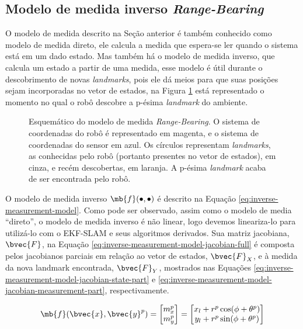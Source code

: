 \subsection{Modelo de medida inverso \textit{Range-Bearing}}
\label{sec:inverse-measurement-model}
O modelo de medida descrito na Seção anterior é também conhecido como modelo de medida direto, ele calcula a medida que espera-se ler quando o sistema está em um dado estado. Mas também há o modelo de medida inverso, que calcula um estado a partir de uma medida, esse modelo é útil durante o descobrimento de novas \textit{landmarks}, pois ele dá meios para que suas posições sejam  incorporadas no vetor de estados, na Figura \ref{fig:range-bearing-inverse-model-schematic} está representado o momento no qual o robô descobre a p-ésima \textit{landmark} do ambiente.
\begin{figure}[h]
  
  \caption{Esquemático do modelo de medida \textit{Range-Bearing}. O sistema de coordenadas do robô é representado em magenta, e o sistema de coordenadas do sensor em azul. Os círculos representam \textit{landmarks}, as conhecidas pelo robô (portanto presentes no vetor de estados), em cinza, e recém descobertas, em laranja. A p-ésima \textit{landmark} acaba de ser encontrada pelo robô.}
  \label{fig:range-bearing-inverse-model-schematic}
\end{figure}

O modelo de medida inverso $\mb{f}(\bullet, \bullet)$ é descrito na Equação \ref{eq:inverse-measurement-model}. Como pode ser observado, assim como o 
modelo de media ``direto'', o modelo de medida inverso é não linear, logo devemos lineariza-lo para utilizá-lo com o EKF-SLAM e seus 
algoritmos derivados. Sua matriz jacobiana, $\bvec{F}$, na Equação \ref{eq:inverse-measurement-model-jacobian-full} é composta pelos jacobianos 
parciais em relação ao vetor de estados, $\bvec{F}_X$, e à medida da nova 
landmark encontrada, $\bvec{F}_Y$, mostrados nas Equações \ref{eq:inverse-measurement-model-jacobian-state-part} e \ref{eq:inverse-measurement-model-jacobian-measurement-part}, respectivamente.

\begin{equation}
  \mb{f}(\bvec{x}, \bvec{y}^{p}) = 
    \begin{bmatrix}
        m_x^p \\
        m_y^p \\
    \end{bmatrix} =
    \begin{bmatrix}
        x_l + r^p \cos(\phi + \theta^p)\\
        y_l + r^p \sin(\phi + \theta^p) 
    \end{bmatrix}
    \label{eq:inverse-measurement-model}
\end{equation}

